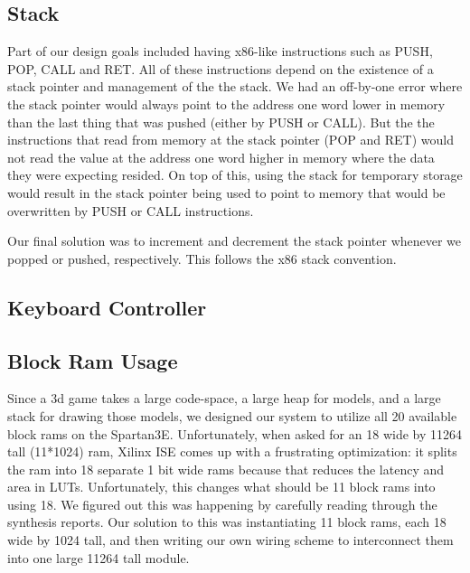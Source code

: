 \documentclass[onecolumn]{IEEEtran}
\begin{document}
\subsection{Stack}
Part of our design goals included having x86-like instructions such as PUSH, POP, CALL and RET.  All of these instructions depend on the existence of a stack pointer and management of the the stack.  We had an off-by-one error where the stack pointer would always point to the address one word lower in memory than the last thing that was pushed (either by PUSH or CALL).  But the the instructions that read from memory at the stack pointer (POP and RET) would not read the value at the address one word higher in memory where the data they were expecting resided.  On top of this, using the stack for temporary storage would result in the stack pointer being used to point to memory that would be overwritten by PUSH or CALL instructions.

Our final solution was to increment and decrement the stack pointer whenever we popped or pushed, respectively.  This follows the x86 stack convention.

\subsection{Keyboard Controller}

 
\subsection{Block Ram Usage}
Since a 3d game takes a large code-space, a large heap for models, and a large stack for drawing those models, we designed our system to utilize all 20 available block rams on the Spartan3E.  Unfortunately, when asked for an 18 wide by 11264 tall (11*1024) ram, Xilinx ISE comes up with a frustrating optimization: it splits the ram into 18 separate 1 bit wide rams because that reduces the latency and area in LUTs.  Unfortunately, this changes what should be 11 block rams into using 18.  We figured out this was happening by carefully reading through the synthesis reports.  Our solution to this was instantiating 11 block rams, each 18 wide by 1024 tall, and then writing our own wiring scheme to interconnect them into one large 11264 tall module.
\end{document}
